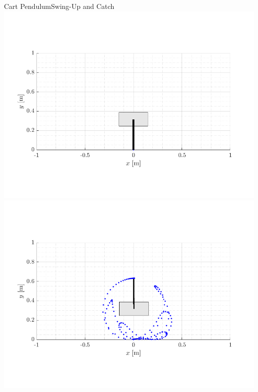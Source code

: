 \begin{frame}{Cart Pendulum}{Swing-Up and Catch}
  {
  \vspace{-.3cm}
  \includegraphics[width=1\textwidth]{figures/cartPendulumAni/ani-0}
  }
  {
    \vspace{-.3cm}
  }
  {
    \vspace{-.3cm}
    \includegraphics[width=1\textwidth]{figures/cartPendulumAni/ani-119}
  }
\end{frame}


